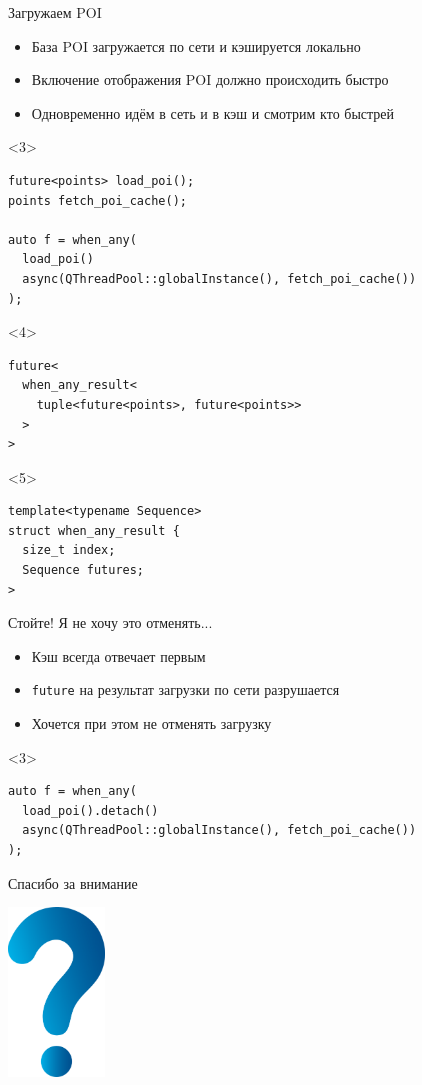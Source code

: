 \documentclass[aspectratio=169,pdf,hyperref={unicode},14pt]{beamer}
\begin{document}
\begin{frame}[fragile,t]{Загружаем POI}
 \begin{itemize}[<+->]
  \item База POI загружается по сети и кэшируется локально
  \item Включение отображения POI должно происходить быстро
  \item Одновременно идём в сеть и в кэш и смотрим кто быстрей
 \end{itemize}
 \begin{onlyenv}<3>
 \begin{lstlisting}[style=cppcode]
future<points> load_poi();
points fetch_poi_cache();

auto f = when_any(
  load_poi()
  async(QThreadPool::globalInstance(), fetch_poi_cache())
);
 \end{lstlisting}
 \end{onlyenv}
 \begin{onlyenv}<4>
 \begin{lstlisting}[style=cppcode]
future<
  when_any_result<
    tuple<future<points>, future<points>>
  >
>
 \end{lstlisting}
 \end{onlyenv}
 \begin{onlyenv}<5>
 \begin{lstlisting}[style=cppcode]
template<typename Sequence>
struct when_any_result {
  size_t index;
  Sequence futures;
>
 \end{lstlisting}
 \end{onlyenv}
\end{frame}

\begin{frame}[fragile,t]{Стойте! Я не хочу это отменять...}
 \begin{itemize}[<+->]
  \item Кэш всегда отвечает первым
  \item \texttt{future} на результат загрузки по сети разрушается
  \item Хочется при этом не отменять загрузку
 \end{itemize}
 \begin{onlyenv}<3>
 \begin{lstlisting}[style=cppcode]
auto f = when_any(
  load_poi().detach()
  async(QThreadPool::globalInstance(), fetch_poi_cache())
);
 \end{lstlisting}
 \end{onlyenv}
\end{frame}

\begin{frame}{Спасибо за внимание}
\centerline{\includegraphics[height=4.5cm]{question_mark_blue.png}}
\end{frame}
\end{document}
